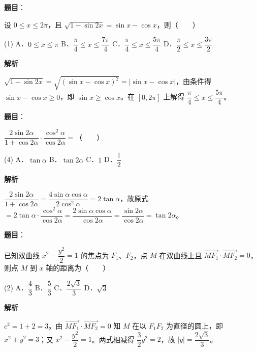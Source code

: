 \begin{answer}

\textbf{题目}：

设 $0 \leqslant x \leqslant 2\pi$，且 $\sqrt{1 - \sin 2x} = \sin x - \cos x$，则\mbox{（　　）}

\begin{gkopts}(1)
\task A．$0 \leqslant x \leqslant \pi$
\task B．$\dfrac{\pi}{4} \leqslant x \leqslant \dfrac{7\pi}{4}$
\task C．$\dfrac{\pi}{4} \leqslant x \leqslant \dfrac{5\pi}{4}$
\task D．$\dfrac{\pi}{2} \leqslant x \leqslant \dfrac{3\pi}{2}$
\end{gkopts}

\textbf{解析}

$\sqrt{1 - \sin 2x} = \sqrt{(\sin x - \cos x)^2} = \left|\sin x - \cos x\right|$，由条件得 $\sin x - \cos x \geqslant 0$，即 $\sin x \geqslant \cos x$。在 $[0, 2\pi]$ 上解得 $\dfrac{\pi}{4} \leqslant x \leqslant \dfrac{5\pi}{4}$。


\end{answer}
\begin{answer}

\textbf{题目}：

$\dfrac{2\sin 2\alpha}{1 + \cos 2\alpha} \cdot \dfrac{\cos^2 \alpha}{\cos 2\alpha} =$\mbox{（　　）}

\begin{gkopts}(4)
\task A．$\tan \alpha$
\task B．$\tan 2\alpha$
\task C．$1$
\task D．$\dfrac{1}{2}$
\end{gkopts}

\textbf{解析}

$\dfrac{2\sin 2\alpha}{1 + \cos 2\alpha} = \dfrac{4\sin\alpha\cos\alpha}{2\cos^2\alpha} = 2\tan\alpha$，故原式 $= 2\tan\alpha\cdot\dfrac{\cos^2\alpha}{\cos 2\alpha} = \dfrac{2\sin\alpha\cos\alpha}{\cos 2\alpha} = \dfrac{\sin 2\alpha}{\cos 2\alpha} = \tan 2\alpha$。


\end{answer}
\begin{answer}

\textbf{题目}：

已知双曲线 $x^2 - \dfrac{y^2}{2} = 1$ 的焦点为 $F_1$、$F_2$，点 $M$ 在双曲线上且 $\overrightarrow{MF_1} \cdot \overrightarrow{MF_2} = 0$，则点 $M$ 到 $x$ 轴的距离为\mbox{（　　）}

\begin{gkopts}(2)
\task A．$\dfrac{4}{3}$
\task B．$\dfrac{5}{3}$
\task C．$\dfrac{2\sqrt{3}}{3}$
\task D．$\sqrt{3}$
\end{gkopts}

\textbf{解析}

$c^2 = 1 + 2 = 3$。由 $\overrightarrow{MF_1}\cdot\overrightarrow{MF_2} = 0$ 知 $M$ 在以 $F_1F_2$ 为直径的圆上，即 $x^2 + y^2 = 3$；又 $x^2 - \dfrac{y^2}{2} = 1$。两式相减得 $\dfrac{3}{2}y^2 = 2$，故 $|y| = \dfrac{2\sqrt{3}}{3}$。


\end{answer}
